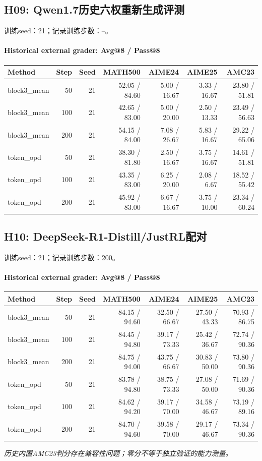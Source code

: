 \subsection{H09: Qwen1.7历史六权重新生成评测}
\label{history:qwen17_reeval}
训练seed：21；记录训练步数：--。
\paragraph{Historical external grader: Avg@8 / Pass@8}
{\footnotesize\setlength{\tabcolsep}{3.5pt}
\begin{longtable}{@{}p{1.4in}rrrrrr@{}}
\toprule
Method & Step & Seed & MATH500 & AIME24 & AIME25 & AMC23 \\
\midrule\endhead
block3\_\allowbreak{}mean & 50 & 21 & 52.05 / 84.60 & 5.00 / 16.67 & 3.33 / 16.67 & 23.80 / 51.81 \\
block3\_\allowbreak{}mean & 100 & 21 & 42.65 / 83.00 & 5.00 / 20.00 & 2.50 / 13.33 & 23.49 / 56.63 \\
block3\_\allowbreak{}mean & 200 & 21 & 54.15 / 84.00 & 7.08 / 26.67 & 5.83 / 16.67 & 29.22 / 65.06 \\
token\_\allowbreak{}opd & 50 & 21 & 38.30 / 81.80 & 2.50 / 16.67 & 3.75 / 16.67 & 14.61 / 51.81 \\
token\_\allowbreak{}opd & 100 & 21 & 43.35 / 83.00 & 6.25 / 20.00 & 2.08 / 6.67 & 18.52 / 55.42 \\
token\_\allowbreak{}opd & 200 & 21 & 45.92 / 83.00 & 6.67 / 16.67 & 3.75 / 10.00 & 23.34 / 60.24 \\
\bottomrule\end{longtable}
}
\subsection{H10: DeepSeek-R1-Distill/JustRL配对}
\label{history:deepseek_justrl}
训练seed：21；记录训练步数：200。
\paragraph{Historical external grader: Avg@8 / Pass@8}
{\footnotesize\setlength{\tabcolsep}{3.5pt}
\begin{longtable}{@{}p{1.4in}rrrrrr@{}}
\toprule
Method & Step & Seed & MATH500 & AIME24 & AIME25 & AMC23 \\
\midrule\endhead
block3\_\allowbreak{}mean & 50 & 21 & 84.15 / 94.60 & 32.50 / 66.67 & 27.50 / 43.33 & 70.93 / 86.75 \\
block3\_\allowbreak{}mean & 100 & 21 & 84.45 / 94.80 & 39.17 / 73.33 & 25.42 / 36.67 & 72.74 / 90.36 \\
block3\_\allowbreak{}mean & 200 & 21 & 84.75 / 94.00 & 43.75 / 66.67 & 30.83 / 50.00 & 73.80 / 90.36 \\
token\_\allowbreak{}opd & 50 & 21 & 83.78 / 94.80 & 38.75 / 73.33 & 27.08 / 50.00 & 71.69 / 90.36 \\
token\_\allowbreak{}opd & 100 & 21 & 84.62 / 94.20 & 39.17 / 70.00 & 34.58 / 46.67 & 73.19 / 89.16 \\
token\_\allowbreak{}opd & 200 & 21 & 84.70 / 94.60 & 39.58 / 70.00 & 29.17 / 46.67 & 73.34 / 90.36 \\
\bottomrule\end{longtable}
}
\emph{历史内置AMC23判分存在兼容性问题；零分不等于独立验证的能力测量。}
